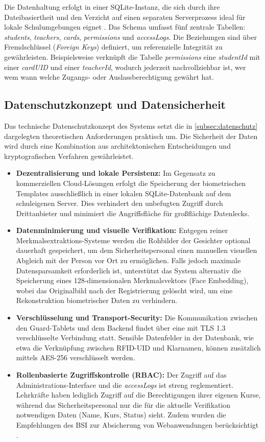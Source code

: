 Die Datenhaltung erfolgt in einer SQLite-Instanz, die sich durch ihre Dateibasiertheit und den Verzicht auf einen separaten Serverprozess ideal für lokale Schulumgebungen eignet \autocite{sqlite2023}. Das Schema umfasst fünf zentrale Tabellen: \textit{students}, \textit{teachers}, \textit{cards}, \textit{permissions} und \textit{accessLogs}. Die Beziehungen sind über Fremdschlüssel (\textit{Foreign Keys}) definiert, um referenzielle Integrität zu gewährleisten. Beispielsweise verknüpft die Tabelle \textit{permissions} eine \textit{studentId} mit einer \textit{cardUID} und einer \textit{teacherId}, wodurch jederzeit nachvollziehbar ist, wer wem wann welche Zugangs- oder Auslassberechtigung gewährt hat.

\subsection{Datenschutzkonzept und Datensicherheit} \label{subsec:konzept_datenschutz}
Das technische Datenschutzkonzept des Systems setzt die in \autoref{subsec:datenschutz} dargelegten theoretischen Anforderungen praktisch um. Die Sicherheit der Daten wird durch eine Kombination aus architektonischen Entscheidungen und kryptografischen Verfahren gewährleistet.

\begin{itemize}
    \item \textbf{Dezentralisierung und lokale Persistenz:} Im Gegensatz zu kommerziellen Cloud-Lösungen erfolgt die Speicherung der biometrischen Templates ausschließlich in einer lokalen SQLite-Datenbank auf dem schuleigenen Server. Dies verhindert den unbefugten Zugriff durch Drittanbieter und minimiert die Angriffsfläche für großflächige Datenlecks.
    \item \textbf{Datenminimierung und visuelle Verifikation:} Entgegen reiner Merkmalsextraktions-Systeme werden die Rohbilder der Gesichter optional dauerhaft gespeichert, um dem Sicherheitspersonal einen manuellen visuellen Abgleich mit der Person vor Ort zu ermöglichen. Falls jedoch maximale Datensparsamkeit erforderlich ist, unterstützt das System alternativ die Speicherung eines 128-dimensionalen Merkmalsvektors (Face Embedding), wobei das Originalbild nach der Registrierung gelöscht wird, um eine Rekonstruktion biometrischer Daten zu verhindern.
    \item \textbf{Verschlüsselung und Transport-Security:} Die Kommunikation zwischen den Guard-Tablets und dem Backend findet über eine mit TLS 1.3 verschlüsselte Verbindung statt. Sensible Datenfelder in der Datenbank, wie etwa die Verknüpfung zwischen RFID-UID und Klarnamen, können zusätzlich mittels AES-256 verschlüsselt werden.
    \item \textbf{Rollenbasierte Zugriffskontrolle (RBAC):} Der Zugriff auf das Administrations-Interface und die \textit{accessLogs} ist streng reglementiert. Lehrkräfte haben lediglich Zugriff auf die Berechtigungen ihrer eigenen Kurse, während das Sicherheitspersonal nur die für die aktuelle Verifikation notwendigen Daten (Name, Kurs, Status) sieht. Zudem wurden die Empfehlungen des BSI zur Absicherung von Webanwendungen berücksichtigt \autocite{bsisicherheitscheck}.
\end{itemize}

